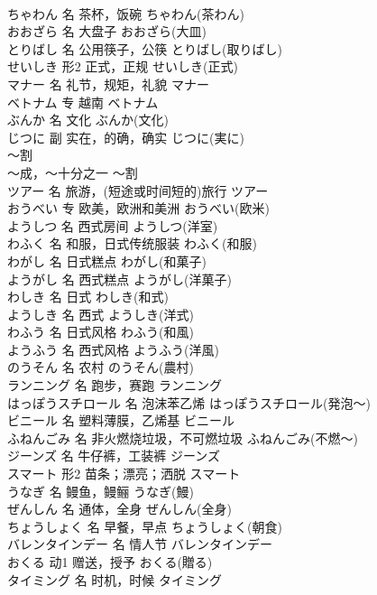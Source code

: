 \documentclass[8pt]{extreport}
\begin{document}
\begin{CJK}{UTF8}{min}
\\	ちゃわん	名	茶杯，饭碗	ちゃわん(茶わん)	
\\	おおざら	名	大盘子	おおざら(大皿)	
\\	とりばし	名	公用筷子，公筷	とりばし(取りばし)	
\\	せいしき	形2	正式，正规	せいしき(正式)	
\\	マナー	名	礼节，规矩，礼貌	マナー	
\\	ベトナム	专	越南	ベトナム	
\\	ぶんか	名	文化	ぶんか(文化)	
\\	じつに	副	实在，的确，确实	じつに(実に)	
\\	～割	
\\	～成，～十分之一	～割	
\\	ツアー	名	旅游，(短途或时间短的)旅行	ツアー	
\\	おうべい	专	欧美，欧洲和美洲	おうべい(欧米)	
\\	ようしつ	名	西式房间	ようしつ(洋室)	
\\	わふく	名	和服，日式传统服装	わふく(和服)	
\\	わがし	名	日式糕点	わがし(和菓子)	
\\	ようがし	名	西式糕点	ようがし(洋菓子)	
\\	わしき	名	日式	わしき(和式)	
\\	ようしき	名	西式	ようしき(洋式)	
\\	わふう	名	日式风格	わふう(和風)	
\\	ようふう	名	西式风格	ようふう(洋風)	
\\	のうそん	名	农村	のうそん(農村)	
\\	ランニング	名	跑步，赛跑	ランニング	
\\	はっぽうスチロール	名	泡沫苯乙烯	はっぽうスチロール(発泡～)	
\\	ビニール	名	塑料薄膜，乙烯基	ビニール	
\\	ふねんごみ	名	非火燃烧垃圾，不可燃垃圾	ふねんごみ(不燃～)	
\\	ジーンズ	名	牛仔裤，工装裤	ジーンズ	
\\	スマート	形2	苗条；漂亮；洒脱	スマート	
\\	うなぎ	名	鳗鱼，鳗鲡	うなぎ(鰻)	
\\	ぜんしん	名	通体，全身	ぜんしん(全身)	
\\	ちょうしょく	名	早餐，早点	ちょうしょく(朝食)	
\\	バレンタインデー	名	情人节	バレンタインデー	
\\	おくる	动1	赠送，授予	おくる(贈る)	
\\	タイミング	名	时机，时候	タイミング	

\end{CJK}
\end{document}
